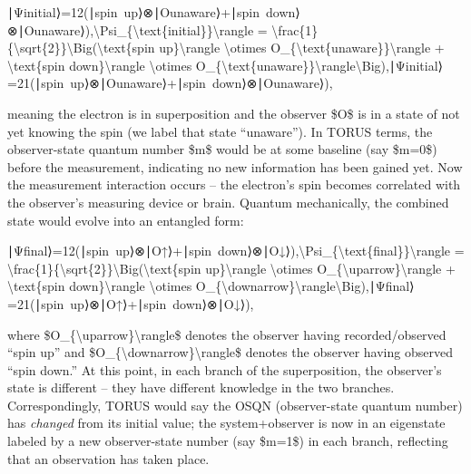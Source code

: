 \documentclass[
]{article}
\begin{document}
∣Ψinitial⟩=12(∣spin~up⟩⊗∣Ounaware⟩+∣spin~down⟩⊗∣Ounaware⟩),\textbar\textbackslash Psi\_\{\textbackslash text\{initial\}\}\textbackslash rangle
=
\textbackslash frac\{1\}\{\textbackslash sqrt\{2\}\}\textbackslash Big(\textbar\textbackslash text\{spin
up\}\textbackslash rangle \textbackslash otimes
\textbar O\_\{\textbackslash text\{unaware\}\}\textbackslash rangle +
\textbar\textbackslash text\{spin down\}\textbackslash rangle
\textbackslash otimes
\textbar O\_\{\textbackslash text\{unaware\}\}\textbackslash rangle\textbackslash Big),∣Ψinitial\hspace{0pt}⟩=2\hspace{0pt}1\hspace{0pt}(∣spin~up⟩⊗∣Ounaware\hspace{0pt}⟩+∣spin~down⟩⊗∣Ounaware\hspace{0pt}⟩),

meaning the electron is in superposition and the observer \$O\$ is in a
state of not yet knowing the spin (we label that state
``unaware'')\hspace{0pt}. In TORUS terms, the observer-state quantum
number \$m\$ would be at some baseline (say \$m=0\$) before the
measurement, indicating no new information has been gained
yet\hspace{0pt}. Now the measurement interaction occurs -- the
electron's spin becomes correlated with the observer's measuring device
or brain. Quantum mechanically, the combined state would evolve into an
entangled form:

∣Ψfinal⟩=12(∣spin~up⟩⊗∣O↑⟩+∣spin~down⟩⊗∣O↓⟩),\textbar\textbackslash Psi\_\{\textbackslash text\{final\}\}\textbackslash rangle
=
\textbackslash frac\{1\}\{\textbackslash sqrt\{2\}\}\textbackslash Big(\textbar\textbackslash text\{spin
up\}\textbackslash rangle \textbackslash otimes
\textbar O\_\{\textbackslash uparrow\}\textbackslash rangle +
\textbar\textbackslash text\{spin down\}\textbackslash rangle
\textbackslash otimes
\textbar O\_\{\textbackslash downarrow\}\textbackslash rangle\textbackslash Big),∣Ψfinal\hspace{0pt}⟩=2\hspace{0pt}1\hspace{0pt}(∣spin~up⟩⊗∣O↑\hspace{0pt}⟩+∣spin~down⟩⊗∣O↓\hspace{0pt}⟩),

where \$\textbar O\_\{\textbackslash uparrow\}\textbackslash rangle\$
denotes the observer having recorded/observed ``spin up'' and
\$\textbar O\_\{\textbackslash downarrow\}\textbackslash rangle\$
denotes the observer having observed ``spin down.'' At this point, in
each branch of the superposition, the observer's state is different --
they have different knowledge in the two branches\hspace{0pt}.
Correspondingly, TORUS would say the OSQN (observer-state quantum
number) has \emph{changed} from its initial value; the system+observer
is now in an eigenstate labeled by a new observer-state number (say
\$m=1\$) in each branch, reflecting that an observation has taken
place\hspace{0pt}.
\end{document}
